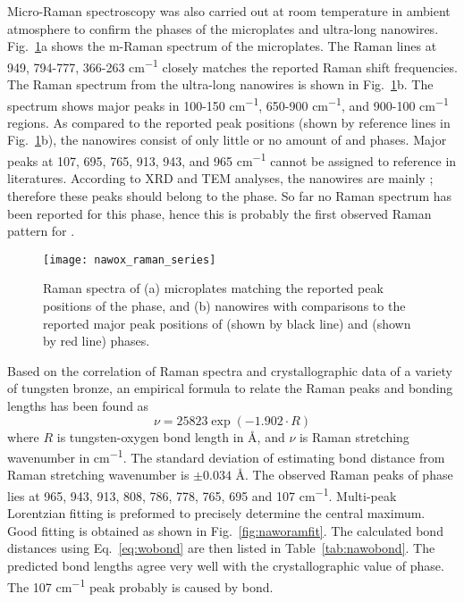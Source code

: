 Micro-Raman spectroscopy was also carried out at room temperature in ambient atmosphere to confirm the phases of the microplates and ultra-long nanowires. Fig.~\ref{fig:nawoxram}a shows the m-Raman spectrum of the microplates. The Raman lines at 949, 794-777, 366-263 \si{cm^{-1}} closely matches the reported  Raman shift frequencies.\cite{Fomichev1992} The Raman spectrum from the ultra-long nanowires is shown in Fig.~\ref{fig:nawoxram}b. The spectrum shows major peaks in 100-150 \si{cm^{-1}}, 650-900 \si{cm^{-1}}, and 900-100 \si{cm^{-1}} regions. As compared to the reported peak positions (shown by reference lines in Fig.~\ref{fig:nawoxram}b), the nanowires consist of only little or no amount of  and  phases. Major peaks at 107, 695, 765, 913, 943, and 965 \si{cm^{-1}} cannot be assigned to reference in literatures. According to XRD and TEM analyses, the nanowires are mainly ; therefore these peaks should belong to the  phase. So far no Raman spectrum has been reported for this phase, hence this is probably the first observed Raman pattern for .
\begin{figure}[htb]
\centering
\texttt{[image: nawox\_raman\_series]}
\caption[Raman spectra on sodium tungsten oxides sample]{Raman spectra of (a) microplates matching the reported peak positions of the  phase, and (b) nanowires with comparisons to the reported major peak positions of  (shown by black line) and  (shown by red line) phases.}
\label{fig:nawoxram}
\end{figure}
Based on the correlation of Raman spectra and crystallographic data of a variety of tungsten bronze, an empirical formula to relate the Raman peaks and  bonding lengths has been found as
\begin{equation}\label{eq:wobond}
\nu = 25823 \exp(-1.902\cdot R)
\end{equation}
where $R$ is tungsten-oxygen bond length in \si{\angstrom}, and $\nu$ is Raman stretching wavenumber in \si{cm^{-1}}.\cite{Hardcastle1995} The standard deviation of estimating  bond distance from Raman stretching wavenumber is $\pm 0.034$ \si{\angstrom}. The observed Raman peaks of  phase lies at 965, 943, 913, 808, 786, 778, 765, 695 and 107 \si{cm^{-1}}. Multi-peak Lorentzian fitting is preformed to precisely determine the central maximum. Good fitting is obtained as shown in Fig.~\ref{fig:naworamfit}. The calculated  bond distances using Eq.~\ref{eq:wobond} are then listed in Table~\ref{tab:nawobond}. The predicted  bond lengths agree very well with the crystallographic value of  phase.\cite{Triantafyllou1999a} The 107 \si{cm^{-1}} peak probably is caused by  bond.
